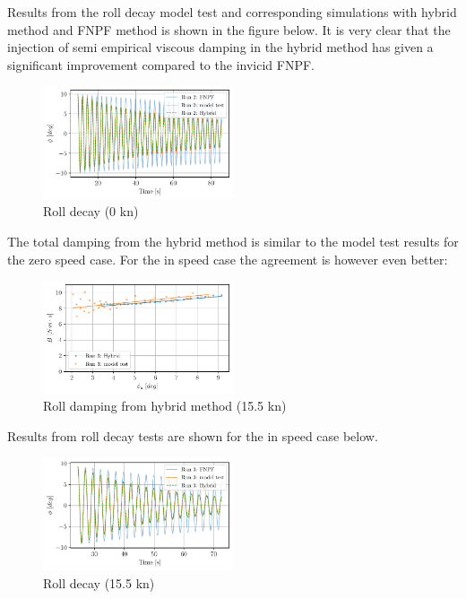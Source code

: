     Results from the roll decay model test and corresponding simulations
with hybrid method and FNPF method is shown in the figure below. It is
very clear that the injection of semi empirical viscous damping in the
hybrid method has given a significant improvement compared to the
invicid FNPF.

    \begin{figure}[H]
        \begin{center}\includegraphics[width = 0.5\textwidth]{figures/hybrid_0_time.pdf}\end{center}
        \vspace{-1cm}
        \caption{Roll decay (0 kn)}
        \label{fig:hybrid_0_time}
    \end{figure}
    
    The total damping from the hybrid method is similar to the model test
results for the zero speed case. For the in speed case the agreement is
however even better:

    \begin{figure}[H]
        \begin{center}\includegraphics[width = 0.5\textwidth]{figures/hybrid_speed_amplitudes.pdf}\end{center}
        \vspace{-1cm}
        \caption{Roll damping from hybrid method (15.5 kn)}
        \label{fig:hybrid_speed_amplitudes}
    \end{figure}
    
    Results from roll decay tests are shown for the in speed case below.

    \begin{figure}[H]
        \begin{center}\includegraphics[width = 0.5\textwidth]{figures/hybrid_speed_time.pdf}\end{center}
        \vspace{-1cm}
        \caption{Roll decay (15.5 kn)}
        \label{fig:hybrid_speed_time}
    \end{figure}
    
